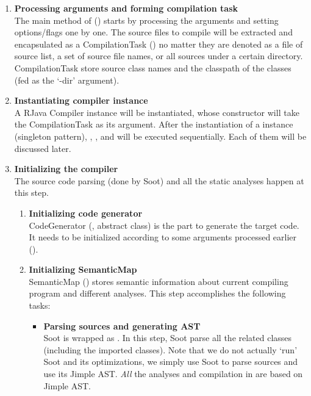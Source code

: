 \documentclass[12pt]{article}
\begin{document}
\begin{enumerate}
\item
\textbf{Processing arguments and forming compilation task\\}
The main method of \rjcfull
()
starts by processing the arguments and 
setting options/flags one by one. The source files to compile
will be extracted and encapsulated as a CompilationTask
()
no matter they are denoted as a file of source list, 
a set of source file names, or all sources under a certain directory. 
CompilationTask store source class names and the
classpath of the classes (fed as the `-dir' argument). 

\item
\textbf{Instantiating compiler instance\\}
A RJava Compiler instance will be instantiated, whose
constructor will take the CompilationTask as its
argument. After the instantiation of a 
 instance
(singleton pattern), 
, , and 
 will be executed sequentially. 
Each of them will be discussed later. 

\item
\textbf{Initializing the compiler\\}
The source code parsing (done by Soot) 
and all the static analyses happen at this step. 
  \begin{enumerate}
  \item
  \textbf{Initializing code generator\\}
  CodeGenerator (, 
  abstract class) is the part to generate the target code. It needs to
  be initialized according to some arguments processed earlier
  ().
  \item
  \textbf{Initializing SemanticMap\\}
  SemanticMap ()
  stores semantic information about current compiling program
  and different analyses. This step accomplishes the following tasks:
    \begin{itemize}

    \item
    \textbf{Parsing sources and generating AST\\}
    Soot is wrapped as .
    In this step, Soot parse all the related classes 
    (including the imported classes). 
    Note that we do not
    actually `run' Soot and its optimizations, we simply use
    Soot to parse sources and use its Jimple AST. \emph{All} the analyses and
    compilation in \rjcfull are based on Jimple AST. 
    

\end{itemize}
\end{enumerate}
\end{enumerate}
\end{document}
